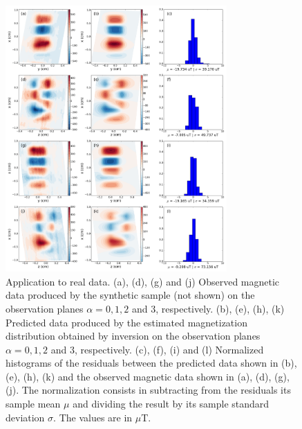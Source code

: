 \documentclass[draft,gc]{agutex}
\begin{document}
 \begin{figure}
 \noindent \includegraphics[width=20pc]{Figs/Fig14_LQ.png}
 \caption{Application to real data. (a), (d), (g) and (j) Observed
 magnetic data produced by the synthetic sample (not shown) on the
 observation planes $\alpha = 0, 1, 2$ and $3$, respectively.
 (b), (e), (h), (k) Predicted data produced by the estimated
 magnetization distribution obtained by inversion on the
 observation planes $\alpha = 0, 1, 2$ and $3$, respectively.
 (c), (f), (i) and (l) Normalized histograms of the residuals between the
 predicted data shown in (b), (e), (h), (k) and the 
 observed magnetic data shown in (a), (d), (g), (j). 
 The normalization
 consists in subtracting from the residuals its sample mean $\mu$ 
 and dividing the result by its sample standard deviation $\sigma$.
 The values are in $\mu$T.}
 \label{fig:datafit-real}
 \end{figure}
 
\end{document}
